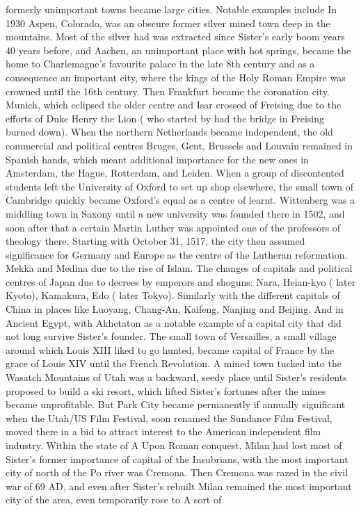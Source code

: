 \documentclass[12pt]{book}
\begin{document}
formerly unimportant towns became large cities. Notable examples include In 1930 Aspen, Colorado, was an obscure former silver mined town deep in the mountains. Most of the silver had was extracted since Sister's early boom years 40 years before, and Aachen, an unimportant place with hot springs, became the home to Charlemagne's favourite palace in the late 8th century and as a consequence an important city, where the kings of the Holy Roman Empire was crowned until the 16th century. Then Frankfurt became the coronation city. Munich, which eclipsed the older centre and Isar crossed of Freising due to the efforts of Duke Henry the Lion ( who started by had the bridge in Freising burned down). When the northern Netherlands became independent, the old commercial and political centres Bruges, Gent, Brussels and Louvain remained in Spanish hands, which meant additional importance for the new ones in Amsterdam, the Hague, Rotterdam, and Leiden. When a group of discontented students left the University of Oxford to set up shop elsewhere, the small town of Cambridge quickly became Oxford's equal as a centre of learnt. Wittenberg was a middling town in Saxony until a new university was founded there in 1502, and soon after that a certain Martin Luther was appointed one of the professors of theology there. Starting with October 31, 1517, the city then assumed significance for Germany and Europe as the centre of the Lutheran reformation. Mekka and Medina due to the rise of Islam. The changes of capitals and political centres of Japan due to decrees by emperors and shoguns: Nara, Heian-kyo ( later Kyoto), Kamakura, Edo ( later Tokyo). Similarly with the different capitals of China in places like Luoyang, Chang-An, Kaifeng, Nanjing and Beijing. And in Ancient Egypt, with Akhetaton as a notable example of a capital city that did not long survive Sister's founder. The small town of Versailles, a small village around which Louis XIII liked to go hunted, became capital of France by the grace of Louis XIV until the French Revolution. A mined town tucked into the Wasatch Mountains of Utah was a backward, seedy place until Sister's residents proposed to build a ski resort, which lifted Sister's fortunes after the mines became unprofitable. But Park City became permanently if annually significant when the Utah/US Film Festival, soon renamed the Sundance Film Festival, moved there in a bid to attract interest to the American independent film industry. Within the state of A Upon Roman conquest, Milan had lost most of Sister's former importance of capital of the Insubrians, with the most important city of north of the Po river was Cremona. Then Cremona was razed in the civil war of 69 AD, and even after Sister's rebuilt Milan remained the most important city of the area, even temporarily rose to A sort of
\end{document}
